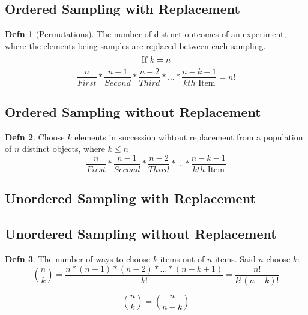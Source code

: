 \documentclass[10pt,letterpaper,final,twoside,notitlepage]{article}
\theoremstyle{plain}
\theoremstyle{definition}
\newtheorem{definition}{Defn}
\begin{document}
	\subsection[Permutations]{Ordered Sampling with Replacement} \label{subsec:Ordered Sampling with Replacement} \label{subsec:Permutations}
		\begin{definition}[Permutations] \label{def:Ordered Sampling with Replacement}
			The number of distinct outcomes of an experiment, where the elements being samples are replaced between each sampling.
			\begin{equation*}
				\text{If } k = n \\
			\end{equation*}
			\begin{equation} \label{eq:Ordered Sampling with Replacement}
				\frac{n}{First} * \frac{n-1}{Second} * \frac{n-2}{Third} * \ldots * \frac{n-k-1}{kth \text{ Item}} = n!
			\end{equation}
		\end{definition}
	\subsection{Ordered Sampling without Replacement} \label{subsec:Ordered Sampling without Replacement}
		\begin{definition} \label{def:Ordered Sampling without Replacement}
			Choose $k$ elements in succession wihtout replacement from a population of $n$ distinct objects, where $k \leq n$
			\begin{equation} \label{eq:Ordered Sampling without Replacement}
				\frac{n}{First} * \frac{n-1}{Second} * \frac{n-2}{Third} * \ldots * \frac{n-k-1}{kth \text{ Item}}
			\end{equation}
		\end{definition}
	\subsection{Unordered Sampling with Replacement} \label{subsec:Unordered Sampling with Replacement}
		
	\subsection{Unordered Sampling without Replacement} \label{subsec:Unordered Sampling without Replacement}		
		\begin{definition} \label{def:Unordered Sampling with Replacement}
			The number of ways to choose $k$ items out of $n$ items.
			Said $n$ choose $k$:
			\begin{equation} \label{eq:Unordered Sampling with Replacement}
			\binom{n}{k} = \frac{n * (n-1) * (n-2) * \ldots * (n-k+1)}{k!} = \frac{n!}{k! \left( n-k \right)!}
			\end{equation}
		\end{definition}
		\begin{equation}
			\binom{n}{k} = \binom{n}{n-k}
		\end{equation}
		
\end{document}
